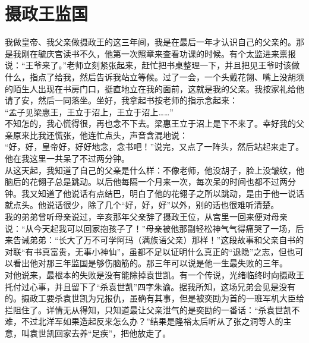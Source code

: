 \fancyhead[RO]{} %
\fancyhead[LE]{} %
\chapter*{摄政王监国}
\thispagestyle{empty}
我做皇帝、我父亲做摄政王的这三年间，我是在最后一年才认识自己的父亲的。那是我刚在毓庆宫读书不久，他第一次照章来查看功课的时候。有个太监进来禀报说：“王爷来了。”老师立刻紧张起来，赶忙把书桌整理一下，并且把见王爷时该做什么，指点了给我，然后告诉我站立等候。过了一会，一个头戴花翎、嘴上没胡须的陌生人出现在书房门口，挺直地立在我的面前，这就是我的父亲。我按家礼给他请了安，然后一同落坐。坐好，我拿起书按老师的指示念起来：\\

“孟子见梁惠王，王立于沼上，王立于沼上……”\\

不知怎的，我心慌得很，再也念不下去。梁惠王立于沼上是下不来了。幸好我的父亲原来比我还慌张，他连忙点头，声音含混地说：\\

“好，好，皇帝好，好好地念，念书吧！”说完，又点了一阵头，然后站起来走了。他在我这里一共呆了不过两分钟。\\

从这天起，我知道了自己的父亲是什么样：不像老师，他没胡子，脸上没皱纹，他脑后的花翎子总是跳动。以后他每隔一个月来一次，每次呆的时间也都不过两分钟。我又知道了他说话有点结巴，明白了他的花翎子之所以跳动，是由于他一说话就点头。他说话很少，除了几个“好，好，好”以外，别的话也很难听清楚。\\

我的弟弟曾听母亲说过，辛亥那年父亲辞了摄政王位，从宫里一回来便对母亲说：“从今天起我可以回家抱孩子了！”母亲被他那副轻松神气气得痛哭了一场，后来告诫弟弟：“长大了万不可学阿玛（满族语父亲）那样！”这段故事和父亲自书的对联“有书真富贵，无事小神仙”，虽都不足以证明什么真正的“退隐”之志，但也可以看出他对那三年监国是够伤脑筋的。那三年可以说是他一生最失败的三年。\\

对他说来，最根本的失败是没有能除掉袁世凯。有一个传说，光绪临终时向摄政王托付过心事，并且留下了“杀袁世凯”四字朱谕。据我所知，这场兄弟会见是没有的。摄政工要杀袁世凯为兄报仇，虽确有其事，但是被奕劻为首的一班军机大臣给拦阻住了。详情无从得知，只知道最让父亲泄气的是奕劻的一番话：“杀袁世凯不难，不过北洋军如果造起反来怎么办？”结果是隆裕太后听从了张之洞等人的主意，叫袁世凯回家去养“足疾”，把他放走了。\\

